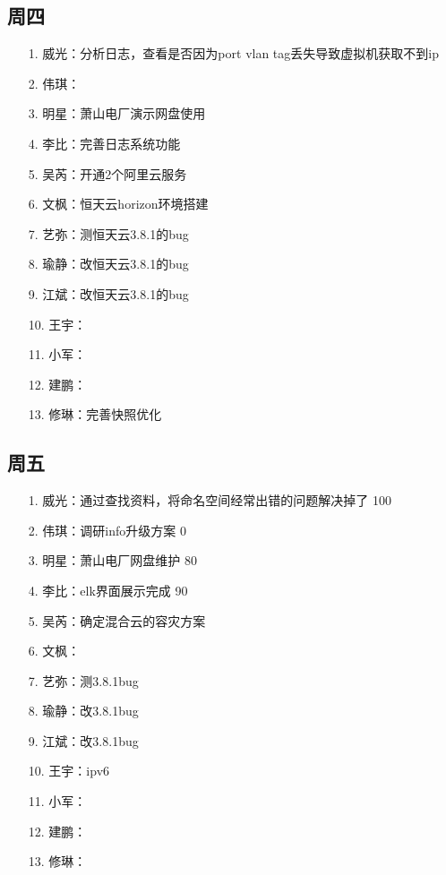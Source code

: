 \documentclass[a4paper,left=1.5cm,right=1.5cm,11pt]{article}
\begin{document}
\subsection{周四}
    \begin{itemize}
        \item[1.]威光：分析日志，查看是否因为port vlan tag丢失导致虚拟机获取不到ip
		\item[2.]伟琪：
		\item[3.]明星：萧山电厂演示网盘使用
		\item[4.]李比：完善日志系统功能
		\item[5.]吴芮：开通2个阿里云服务
		\item[6.]文枫：恒天云horizon环境搭建
		\item[7.]艺弥：测恒天云3.8.1的bug
		\item[8.]瑜静：改恒天云3.8.1的bug
		\item[9.]江斌：改恒天云3.8.1的bug
		\item[10.]王宇：
		\item[11.]小军：
		\item[12.]建鹏：
		\item[13.]修琳：完善快照优化
    \end{itemize}
\subsection{周五}
	\begin{itemize}
		\item[1.]威光：通过查找资料，将命名空间经常出错的问题解决掉了 100%
		\item[2.]伟琪：调研info升级方案 0%
		\item[3.]明星：萧山电厂网盘维护 80%
		\item[4.]李比：elk界面展示完成 90%
		\item[5.]吴芮：确定混合云的容灾方案
		\item[6.]文枫：
		\item[7.]艺弥：测3.8.1bug
		\item[8.]瑜静：改3.8.1bug
		\item[9.]江斌：改3.8.1bug
		\item[10.]王宇：ipv6
		\item[11.]小军：
		\item[12.]建鹏：
		\item[13.]修琳：
	\end{itemize}
\end{document}
